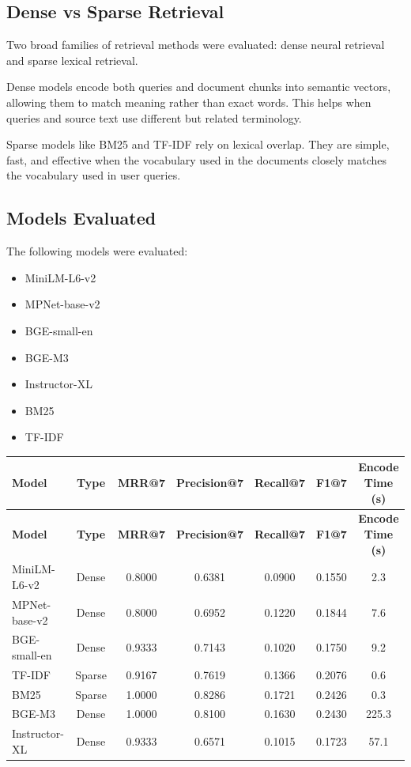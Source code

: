 \documentclass[12pt]{article}
\begin{document}
\subsection{Dense vs Sparse Retrieval}

Two broad families of retrieval methods were evaluated: dense neural retrieval and sparse lexical retrieval.

Dense models encode both queries and document chunks into semantic vectors, allowing them to match meaning rather than exact words. This helps when queries and source text use different but related terminology.

Sparse models like BM25 and TF-IDF rely on lexical overlap. They are simple, fast, and effective when the vocabulary used in the documents closely matches the vocabulary used in user queries.

\subsection{Models Evaluated}

The following models were evaluated:

\begin{itemize}[leftmargin=1.5em]
    \item MiniLM-L6-v2
    \item MPNet-base-v2
    \item BGE-small-en
    \item BGE-M3
    \item Instructor-XL
    \item BM25
    \item TF-IDF
\end{itemize}

\begin{center}
\small
\begin{longtable}{>{\raggedright\arraybackslash}p{1.3in} c c c c c c}
\toprule
\textbf{Model} & \textbf{Type} & \textbf{MRR@7} & \textbf{Precision@7} & \textbf{Recall@7} & \textbf{F1@7} & \textbf{Encode Time (s)} \\
\midrule
\endfirsthead
\toprule
\textbf{Model} & \textbf{Type} & \textbf{MRR@7} & \textbf{Precision@7} & \textbf{Recall@7} & \textbf{F1@7} & \textbf{Encode Time (s)} \\
\midrule
\endhead
MiniLM-L6-v2 & Dense & 0.8000 & 0.6381 & 0.0900 & 0.1550 & 2.3 \\
MPNet-base-v2 & Dense & 0.8000 & 0.6952 & 0.1220 & 0.1844 & 7.6 \\
BGE-small-en & Dense & 0.9333 & 0.7143 & 0.1020 & 0.1750 & 9.2 \\
TF-IDF & Sparse & 0.9167 & 0.7619 & 0.1366 & 0.2076 & 0.6 \\
BM25 & Sparse & 1.0000 & 0.8286 & 0.1721 & 0.2426 & 0.3 \\
BGE-M3 & Dense & 1.0000 & 0.8100 & 0.1630 & 0.2430 & 225.3 \\
Instructor-XL & Dense & 0.9333 & 0.6571 & 0.1015 & 0.1723 & 57.1 \\
\bottomrule
\end{longtable}
\end{center}
\end{document}

